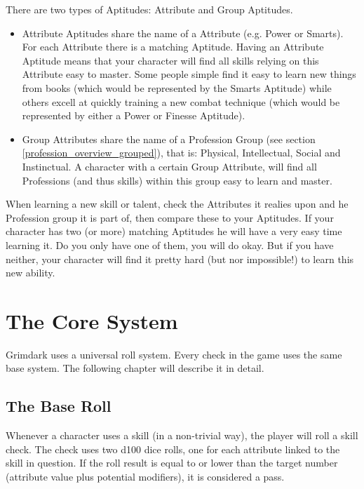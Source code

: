 	There are two types of Aptitudes: Attribute and Group Aptitudes.
	\begin{itemize}
		\item Attribute Aptitudes share the name of a Attribute (e.g. Power or Smarts). For each Attribute there is a matching Aptitude. Having an Attribute Aptitude means that your character will find all skills relying on this Attribute easy to master. Some people simple find it easy to learn new things from books (which would be represented by the Smarts Aptitude) while others excell at quickly training a new combat technique (which would be represented by either a Power or Finesse Aptitude).
		\item Group Attributes share the name of a Profession Group (see section \ref{profession_overview_grouped}), that is: Physical, Intellectual, Social and Instinctual. A character with a certain Group Attribute, will find all Professions (and thus skills) within this group easy to learn and master.
	\end{itemize}

	When learning a new skill or talent, check the Attributes it realies upon and he Profession group it is part of, then compare these to your Aptitudes.
	If your character has two (or more) matching Aptitudes he will have a very easy time learning it.
	Do you only have one of them, you will do okay.
	But if you have neither, your character will find it pretty hard (but nor impossible!) to learn this new ability.


\section{The Core System} %
\label{sec:base_system}
Grimdark uses a universal roll system. Every check in the game uses the same base system. The following chapter will describe it in detail.
\subsection{The Base Roll}
Whenever a character uses a skill (in a non-trivial way), the player will roll a skill check.
The check uses two d100 dice rolls, one for each attribute linked to the skill in question.
If the roll result is equal to or lower than the target number (attribute value plus potential modifiers), it is considered a pass.

